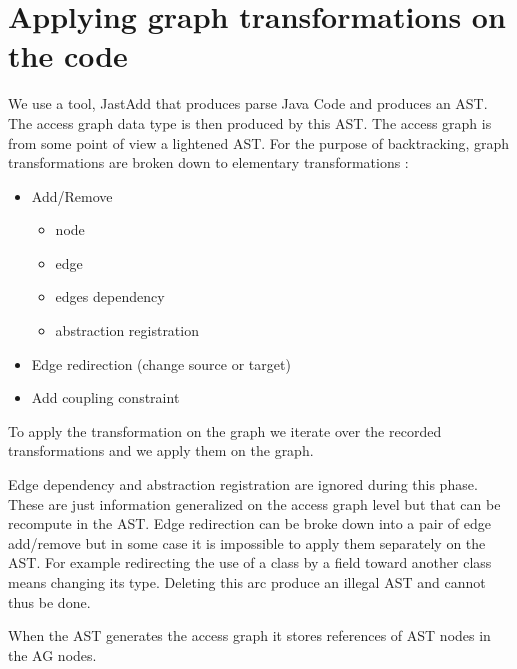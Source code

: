 \documentclass[]{article}
\begin{document}
\section{Applying graph transformations on the code}
We use a tool, JastAdd that produces parse Java Code and produces an AST. The access graph data type is then produced by this AST. The access graph is from some point of view a lightened AST.
For the purpose of backtracking, graph transformations are broken down to elementary transformations : 
\begin{itemize}
\item Add/Remove
	\begin{itemize}
	\item node
	\item edge
	\item edges dependency 
	\item abstraction registration
	\end{itemize}
\item Edge redirection (change source or target)
\item Add coupling constraint	
\end{itemize}

To apply the transformation on the graph we iterate over the recorded transformations and we apply them on the graph.

Edge dependency and abstraction registration are ignored during this phase. These are just information generalized on the access graph level but that can be recompute in the AST.
Edge redirection can be broke down into a pair of edge add/remove but in some case it is impossible to apply them separately on the AST. For example redirecting the use of a class by a field toward another class means changing its type. Deleting this arc produce an illegal AST and cannot thus be done.

When the AST generates the access graph it stores references of AST nodes in the AG nodes.



\end{document}

